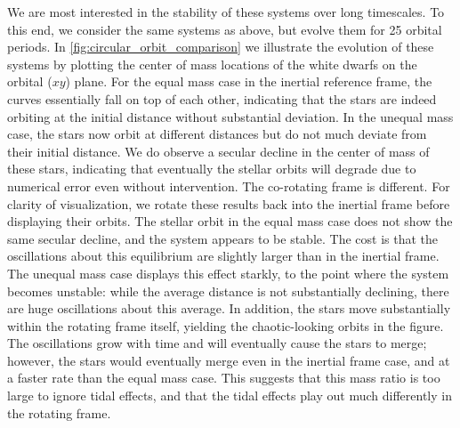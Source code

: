 \documentclass[iop]{../emulateapj}
\begin{document}
\capstartfalse

\capstarttrue

We are most interested in the stability of these systems over long
timescales. To this end, we consider the same systems as above, but
evolve them for 25 orbital periods. In
\autoref{fig:circular_orbit_comparison} we illustrate the evolution of
these systems by plotting the center of mass locations of the white
dwarfs on the orbital ($xy$) plane. For the equal mass case in the
inertial reference frame, the curves essentially fall on top of each
other, indicating that the stars are indeed orbiting at the initial
distance without substantial deviation. In the unequal mass case, the
stars now orbit at different distances but do not much deviate from
their initial distance. We do observe a secular decline in the center
of mass of these stars, indicating that eventually the stellar orbits
will degrade due to numerical error even without intervention. The
co-rotating frame is different.  For clarity of visualization, we
rotate these results back into the inertial frame before displaying
their orbits.  The stellar orbit in the equal mass case does not show
the same secular decline, and the system appears to be
stable. The cost is that the oscillations about this
equilibrium are slightly larger than in the inertial frame. The
unequal mass case displays this effect starkly, to the point where the system 
becomes unstable: while the average distance is not substantially declining, 
there are huge oscillations about this
average. In addition, the stars move substantially within the rotating
frame itself, yielding the chaotic-looking orbits in the figure. The
oscillations grow with time and will eventually cause the stars to
merge; however, the stars would eventually merge even in the inertial
frame case, and at a faster rate than the equal mass case. This
suggests that this mass ratio is too large to ignore tidal effects,
and that the tidal effects play out much differently in the rotating
frame.
\end{document}
